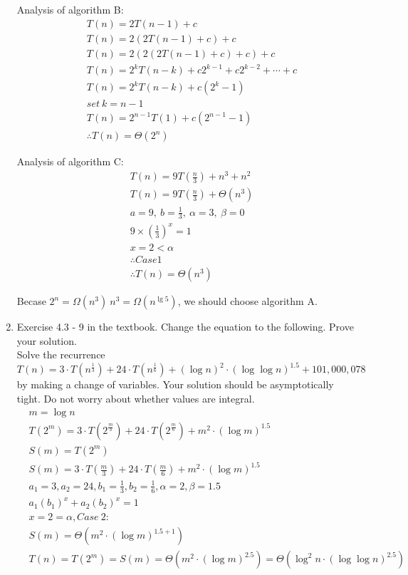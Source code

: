 \documentclass[12pt,letterpaper]{article}
\begin{document}
\begin{enumerate}
Analysis of algorithm B: \\
\begin{align*}
& T(n) = 2T(n-1) + c \\
& T(n) = 2(2T(n-1) + c) + c \\
& T(n) = 2(2(2T(n-1) + c) + c) + c \\
& T(n) = 2^{k} T(n-k) + c 2 ^ {k-1} + c 2^{k - 2} + \cdots + c \\
& T(n) = 2^{k} T(n-k) + c (2^k - 1) \\
& set \ k = n - 1 \\
& T(n) = 2^{n-1} T(1) + c (2 ^ {n - 1} - 1) \\
& \therefore T(n) = \Theta (2^n)
\end{align*}

Analysis of algorithm C: \\
\begin{align*}
& T(n) = 9T(\frac{n}{3}) + n^3 + n^2 \\
& T(n) = 9T(\frac{n}{3}) + \Theta(n^3) \\
& a = 9, \ b = \frac{1}{3}, \ \alpha = 3, \ \beta = 0 \\
& 9 \times (\frac{1}{3}) ^ x = 1 \\
& x = 2 < \alpha \\
& \therefore Case 1 \\
& \therefore T(n) = \Theta( n^3 )
\end{align*}

Becase $ 2^n = \Omega(n^3) \ n^3 = \Omega(n^{\lg 5})$, we should choose algorithm A. \\

\item %

Exercise 4.3 - 9 in the textbook. Change the equation to the following. Prove your solution. \\

Solve the recurrence $T(n) = 3 \cdot T(n^{\frac{1}{3}}) + 24 \cdot T(n^{\frac{1}{6}}) + (\log n)^2 \cdot (\log \log n)^{1.5} + 101,000,078 $ by making a change of variables. Your solution should be asymptotically tight. Do not worry about whether values are integral. \\
\begin{align*}
& m = \log n \\
& T(2^m) = 3\cdot T(2^{\frac{m}{3}}) + 24 \cdot T(2^{\frac{m}{6}}) + m^2 \cdot (\log m)^{1.5} \\
& S(m) = T(2^m) \\
& S(m) = 3 \cdot T(\frac{m}{3}) + 24 \cdot T(\frac{m}{6}) + m^2 \cdot (\log m)^{1.5} \\
& a_1 = 3, a_2 = 24, b_1 = \frac{1}{3}, b_2 = \frac{1}{6}, \alpha = 2, \beta = 1.5 \\
& a_1 (b_1)^x + a_2 (b_2)^x = 1 \\
& x = 2 = \alpha , Case \ 2: \\
& S(m) = \Theta(m^2 \cdot (\log m) ^ {1.5 + 1}) \\
& T(n) = T(2^m) = S(m) = \Theta (m^2 \cdot (\log m)^{2.5}) = \Theta (\log^2 n \cdot (\log \log n)^{2.5} )\\
\end{align*}


\end{enumerate}
\end{document}

